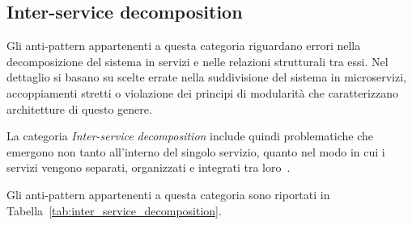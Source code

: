 \normalsize

\subsection{Inter-service decomposition}

Gli anti-pattern appartenenti a questa categoria riguardano errori nella decomposizione del sistema in servizi e nelle relazioni strutturali tra essi. Nel dettaglio si basano su scelte errate nella suddivisione del sistema in microservizi, accoppiamenti stretti o violazione dei principi di modularità che caratterizzano architetture di questo genere.

La categoria \textit{Inter-service decomposition} include quindi problematiche che emergono non tanto all’interno del singolo servizio, quanto nel modo in cui i servizi vengono separati, organizzati e integrati tra loro~\cite{CernyCatalogo}.


Gli anti-pattern appartenenti a questa categoria sono riportati in Tabella~\ref{tab:inter_service_decomposition}.


